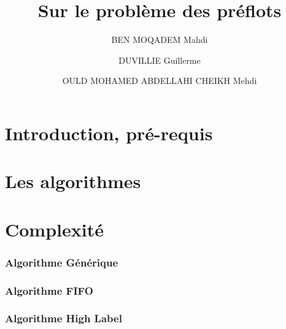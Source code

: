 

\author{BEN MOQADEM Mahdi \and DUVILLIE Guillerme \and OULD MOHAMED ABDELLAHI CHEIKH Mehdi}
\title{Sur le problème des préflots}



\maketitle
\newpage

\tableofcontents
\newpage

\part{Introduction, pré-requis}


\part{Les algorithmes}


\part{Complexité}
\section{Algorithme Générique}


\section{Algorithme FIFO}


\section{Algorithme High Label}






